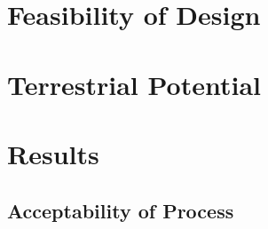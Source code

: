 \documentclass{../tex/report}
\begin{document}
\section{Feasibility of Design}


\section{Terrestrial Potential}



\section{Results}

\subsection{Acceptability of Process}
\end{document}
